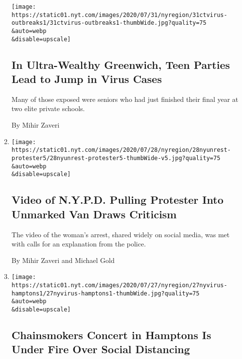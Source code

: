 \begin{enumerate}
  \texttt{[image: https://static01.nyt.com/images/2020/07/31/nyregion/31ctvirus-outbreaks1/31ctvirus-outbreaks1-thumbWide.jpg?quality=75\\\&auto=webp\\\&disable=upscale]}

  \hypertarget{in-ultra-wealthy-greenwich-teen-parties-lead-to-jump-in-virus-cases}{%
  \subsection{In Ultra-Wealthy Greenwich, Teen Parties Lead to Jump in
  Virus
  Cases}\label{in-ultra-wealthy-greenwich-teen-parties-lead-to-jump-in-virus-cases}}

  Many of those exposed were seniors who had just finished their final
  year at two elite private schools.

  By Mihir Zaveri
\item
  \href{/2020/07/28/nyregion/nypd-protester-van.html}{}

  \texttt{[image: https://static01.nyt.com/images/2020/07/28/nyregion/28nyunrest-protester5/28nyunrest-protester5-thumbWide-v5.jpg?quality=75\\\&auto=webp\\\&disable=upscale]}

  \hypertarget{video-of-nypd-pulling-protester-into-unmarked-van-draws-criticism}{%
  \subsection{Video of N.Y.P.D. Pulling Protester Into Unmarked Van
  Draws
  Criticism}\label{video-of-nypd-pulling-protester-into-unmarked-van-draws-criticism}}

  The video of the woman's arrest, shared widely on social media, was
  met with calls for an explanation from the police.

  By Mihir Zaveri and Michael Gold
\item
  \href{/2020/07/27/nyregion/hamptons-chainsmokers-concert-social-distancing.html}{}

  \texttt{[image: https://static01.nyt.com/images/2020/07/27/nyregion/27nyvirus-hamptons1/27nyvirus-hamptons1-thumbWide.jpg?quality=75\\\&auto=webp\\\&disable=upscale]}

  \hypertarget{chainsmokers-concert-in-hamptons-is-under-fire-over-social-distancing}{%
  \subsection{Chainsmokers Concert in Hamptons Is Under Fire Over Social
  Distancing}\label{chainsmokers-concert-in-hamptons-is-under-fire-over-social-distancing}}


\end{enumerate}
